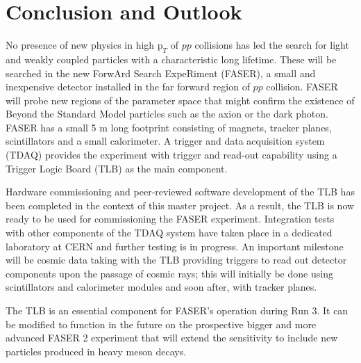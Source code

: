 \chapter{Conclusion and Outlook}

\ifpdf
    \graphicspath{{Conclusion/Figs/Raster/}{Conclusion/Figs/PDF/}{Conclusion/Figs/}}
\else
    \graphicspath{{Conclusion/Figs/Vector/}{Conclusion/Figs/}}
\fi

No presence of new physics in high $\text{p}_{T}$ of $pp$ collisions has led the search for light and weakly coupled particles with a characteristic long lifetime. These will be searched in the new ForwArd Search ExpeRiment (FASER), a small and inexpensive detector installed in the far forward region of $pp$ collision. FASER will probe new regions of the parameter space that might confirm the existence of Beyond the Standard Model particles such as the axion or the dark photon. FASER has a small 5 m long footprint consisting of magnets, tracker planes, scintillators and a small calorimeter. A trigger and data acquisition system (TDAQ) provides the experiment with trigger and read-out capability using a Trigger Logic Board (TLB) as the main component.

Hardware commissioning and peer-reviewed software development of the TLB has been completed in the context of this master project. As a result, the TLB is now ready to be used for commissioning the FASER experiment. Integration tests with other components of the TDAQ system have taken place in a dedicated laboratory at CERN and further testing is in progress. An important milestone will be cosmic data taking  with the TLB  providing triggers to read out detector components upon the passage of cosmic rays; this will initially be done using scintillators and calorimeter modules and soon after, with tracker planes.  

The TLB is an essential component for FASER’s operation during Run 3. It can be modified to function in the future on the prospective bigger and more advanced FASER 2 experiment that will extend the sensitivity to include new particles produced in heavy meson decays. 
